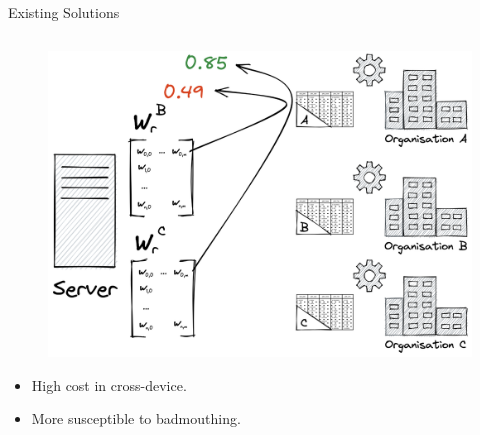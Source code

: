 \begin{frame}{Existing Solutions}
\begin{columns}[T]
{\begin{column}{.33\textwidth}
        \begin{figure}
          \centering
          \includegraphics[height=.36\textheight]{figures/radar/client-side-eval}
        \end{figure}

        \begin{itemize}\smaller
          \item High cost in cross-device.
          \item More susceptible to badmouthing.
        \end{itemize}
      \end{column}%
    }

  \end{columns}

  \vspace{3ex}
  

\end{frame}

